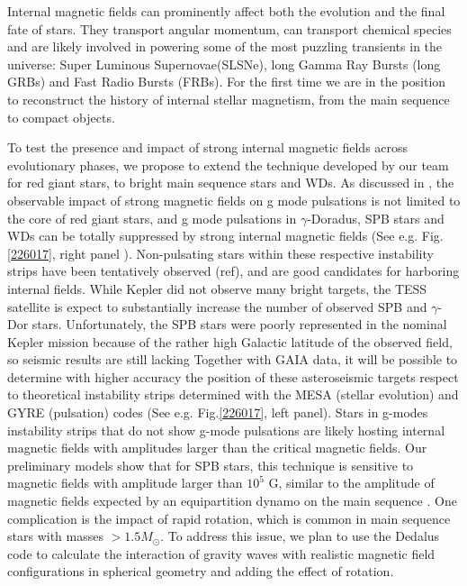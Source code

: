 Internal magnetic fields can prominently affect both the evolution and the final fate of stars. They transport angular momentum, can transport chemical species
and are likely involved in powering some of the most puzzling transients in the universe: Super Luminous Supernovae(SLSNe), long Gamma Ray Bursts (long GRBs) and Fast Radio Bursts (FRBs).
For the first time we are in the position to reconstruct the history of internal stellar magnetism, from the main sequence to compact objects.

To test the presence and impact of strong internal magnetic fields across evolutionary phases,
we propose to extend the technique developed by our team for red giant stars, to bright main sequence stars and WDs.
As discussed in \citet{Cantiello_2016}, the observable impact of strong magnetic fields on g mode pulsations is not limited to the core of red giant stars, and
 g mode pulsations in $\gamma$-Doradus, SPB stars and WDs can be totally suppressed by strong internal magnetic fields (See e.g. Fig.\ref{226017}, right panel ).
Non-pulsating stars within these respective instability strips have been tentatively observed (ref), and are good candidates for harboring internal fields.
While Kepler did not observe many bright targets, the TESS satellite is expect to substantially increase the number of observed SPB and $\gamma$-Dor stars. Unfortunately, the SPB stars were poorly represented in the nominal Kepler mission because
of the rather high Galactic latitude of the observed field, so seismic results are still lacking
Together with GAIA data, it will be possible to determine with higher accuracy the position of these asteroseismic targets respect to
theoretical instability strips determined with the MESA (stellar evolution) and GYRE (pulsation) codes (See e.g. Fig.\ref{226017}, left panel).
Stars in g-modes instability strips that do not show g-mode pulsations are likely hosting internal magnetic fields with amplitudes larger than the critical
magnetic fields. Our preliminary models show that for SPB stars, this technique is sensitive to magnetic fields with amplitude larger than $10^5$ G,
similar to the amplitude of magnetic fields expected by an equipartition dynamo on the main sequence \citep[See e.g.][]{Featherstone_2009,Augustson_2016}.
One complication is the impact of rapid rotation, which is common in main sequence stars with masses $> 1.5M_\odot$. To address this issue,
we plan to use the Dedalus code to calculate the interaction of gravity waves with realistic magnetic field configurations in spherical geometry \citep[e.g.][]{Braithwaite_2006} 
and adding the effect of rotation.
